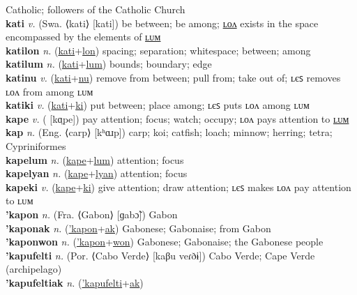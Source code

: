 Catholic; followers of the Catholic Church \label{'katolicismowon} \\
\textbf{kati} \textit{v.} (Swa. ⟨kati⟩ [kati])
be between; be among; \hyperref[katilon]{ʟᴏᴧ} exists in the space encompassed by the elements of \hyperref[katilum]{ʟᴜᴍ} \label{kati} \\
\textbf{katilon} \textit{n.} (\hyperref[kati]{kati}+\hyperref[lon]{lon})
spacing; separation; whitespace; between; among \label{katilon} \\
\textbf{katilum} \textit{n.} (\hyperref[kati]{kati}+\hyperref[lum]{lum})
bounds; boundary; edge \label{katilum} \\
\textbf{katinu} \textit{v.} (\hyperref[kati]{kati}+\hyperref[nu]{nu})
remove from between; pull from; take out of; ʟєꜱ removes ʟᴏᴧ from among ʟᴜᴍ \label{katinu} \\
\textbf{katiki} \textit{v.} (\hyperref[kati]{kati}+\hyperref[ki]{ki})
put between; place among; ʟєꜱ puts ʟᴏᴧ among ʟᴜᴍ \label{katiki} \\
\textbf{kape} \textit{v.} ( [kɑ̤pe])
pay attention; focus; watch; occupy; ʟᴏᴧ pays attention to \hyperref[kapelum]{ʟᴜᴍ} \label{kape} \\
\textbf{kap} \textit{n.} (Eng. ⟨carp⟩ [kʰɑɹp])
carp; koi; catfish; loach; minnow; herring; tetra; Cypriniformes \label{kap} \\
\textbf{kapelum} \textit{n.} (\hyperref[kape]{kape}+\hyperref[lum]{lum})
attention; focus \label{kapelum} \\
\textbf{kapelyan} \textit{n.} (\hyperref[kape]{kape}+\hyperref[lyan]{lyan})
attention; focus \label{kapelyan} \\
\textbf{kapeki} \textit{v.} (\hyperref[kape]{kape}+\hyperref[ki]{ki})
give attention; draw attention; ʟєꜱ makes ʟᴏᴧ pay attention to ʟᴜᴍ \label{kapeki} \\
\textbf{'kapon} \textit{n.} (Fra. ⟨Gabon⟩ [ɡabɔ̃])
Gabon \label{'kapon} \\
\textbf{'kaponak} \textit{n.} (\hyperref['kapon]{'kapon}+\hyperref[ak]{ak})
Gabonese; Gabonaise; from Gabon \label{'kaponak} \\
\textbf{'kaponwon} \textit{n.} (\hyperref['kapon]{'kapon}+\hyperref[won]{won})
Gabonese; Gabonaise; the Gabonese people \label{'kaponwon} \\
\textbf{'kapufelti} \textit{n.} (Por. ⟨Cabo Verde⟩ [kaβu veɾðɨ])
Cabo Verde; Cape Verde (archipelago) \label{'kapufelti} \\
\textbf{'kapufeltiak} \textit{n.} (\hyperref['kapufelti]{'kapufelti}+\hyperref[ak]{ak})
